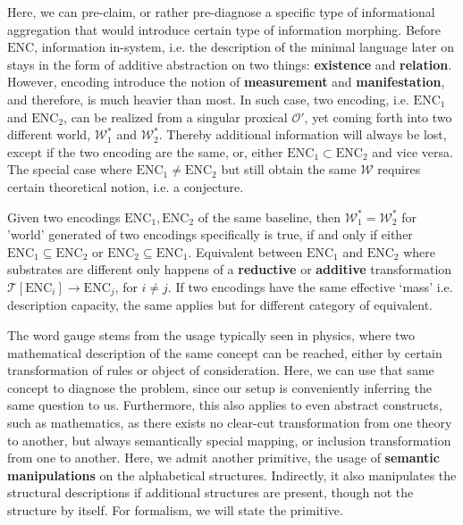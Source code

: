 Here, we can pre-claim, or rather pre-diagnose a specific type of informational aggregation that would introduce certain type of information morphing. Before $\mathrm{ENC}$, information in-system, i.e. the description of the minimal language later on stays in the form of additive abstraction on two things: \textbf{existence} and \textbf{relation}. However, encoding introduce the notion of \textbf{measurement} and \textbf{manifestation}, and therefore, is much heavier than most. In such case, two encoding, i.e. $\mathrm{ENC}_{1}$ and $\mathrm{ENC}_{2}$, can be realized from a singular proxical $\mathcal{O}'$, yet coming forth into two different world, $\mathcal{W}^{*}_{1}$ and $\mathcal{W}^{*}_{2}$. Thereby additional information will always be lost, except if the two encoding are the same, or, either $\mathrm{ENC}_{1}\subset \mathrm{ENC}_{2}$ and vice versa. The special case where $\mathrm{ENC}_{1}\neq \mathrm{ENC}_{2}$ but still obtain the same $\mathcal{W}$ requires certain theoretical notion, i.e. a conjecture. 

\begin{conjecture}[Gauge]
	Given two encodings $\mathrm{ENC}_{1},\mathrm{ENC}_{2}$ of the same baseline, then $\mathcal{W}_{1}^{*}=\mathcal{W}^{*}_{2}$ for 'world' generated of two encodings specifically is true, if and only if either $\mathrm{ENC}_{1}\subseteq\mathrm{ENC}_{2}$ or $\mathrm{ENC}_{2}\subseteq\mathrm{ENC}_{1}$. Equivalent between $\mathrm{ENC}_{1}$ and $\mathrm{ENC}_{2}$ where substrates are different only happens of a \textbf{reductive} or \textbf{additive} transformation $\mathcal{T}[\mathrm{ENC}_{i}]\to \mathrm{ENC}_{j}$, for $i\neq j$. If two encodings have the same effective `mass' i.e. description capacity, the same applies but for different category of equivalent. 
\end{conjecture}

The word gauge stems from the usage typically seen in physics, where two mathematical description of the same concept can be reached, either by certain transformation of rules or object of consideration. Here, we can use that same concept to diagnose the problem, since our setup is conveniently inferring the same question to us. Furthermore, this also applies to even abstract constructs, such as mathematics, as there exists no clear-cut transformation from one theory to another, but always semantically special mapping, or inclusion transformation from one to another. Here, we admit another primitive, the usage of \textbf{semantic manipulations} on the alphabetical structures. Indirectly, it also manipulates the structural descriptions if additional structures are present, though not the structure by itself. For formalism, we will state the primitive. 

